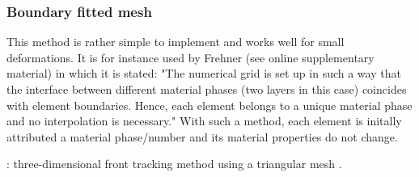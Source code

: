 \subsubsection{Boundary fitted mesh}

This method is rather simple to implement and works well for small deformations. It is 
for instance used by Frehner \cite{freh14} (see online supplementary material) in which it is 
stated: "The numerical grid is set up in such a way that the interface
between different material phases (two layers in this case) coincides with element boundaries. Hence, each
element belongs to a unique material phase and no interpolation is necessary."
With such a method, each element is initally attributed a material phase/number and its material
properties do not change. 


\vspace{2cm} 

\Literature: three-dimensional front tracking method using a triangular mesh \cite{sclo03}.







